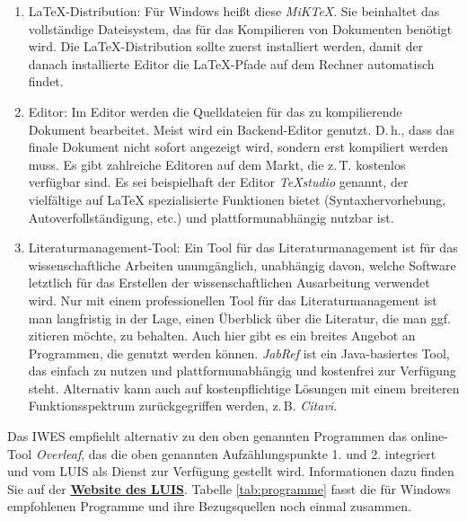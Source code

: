 \begin{enumerate}
	\item \LaTeX{}-Distribution: Für Windows heißt diese \textit{MiKTeX}. Sie beinhaltet das vollständige Dateisystem, das für das Kompilieren von Dokumenten benötigt wird. Die \LaTeX{}-Distribution sollte zuerst installiert werden, damit der danach installierte Editor die \LaTeX{}-Pfade auf dem Rechner automatisch findet.\\
	\item Editor: Im Editor werden die Quelldateien für das zu kompilierende Dokument bearbeitet. Meist wird ein Backend-Editor genutzt. D.\,h., dass das finale Dokument nicht sofort angezeigt wird, sondern erst kompiliert werden muss. Es gibt zahlreiche Editoren auf dem Markt, die z.\,T. kostenlos verfügbar sind. Es sei beispielhaft der Editor \textit{TeXstudio} genannt, der vielfältige auf \LaTeX{} spezialisierte Funktionen bietet (Syntaxhervorhebung, Autoverfollständigung, etc.) und plattformunabhängig nutzbar ist. \\
	\item Literaturmanagement-Tool: Ein Tool für das Literaturmanagement ist für das wissenschaftliche Arbeiten unumgänglich, unabhängig davon, welche Software letztlich für das Erstellen der wissenschaftlichen Ausarbeitung verwendet wird. Nur mit einem professionellen Tool für das Literaturmanagement ist man langfristig in der Lage, einen Überblick über die Literatur, die man ggf. zitieren möchte, zu behalten. Auch hier gibt es ein breites Angebot an Programmen, die genutzt werden können. \textit{JabRef} ist ein Java-basiertes Tool, das einfach zu nutzen und plattformunabhängig und kostenfrei zur Verfügung steht. Alternativ kann auch auf kostenpflichtige Lösungen mit einem breiteren Funktionsspektrum zurückgegriffen werden, z.\,B. \textit{Citavi}.
\end{enumerate}

Das IWES empfiehlt alternativ zu den oben genannten Programmen das online-Tool \textit{Overleaf}, das die oben genannten Aufzählungspunkte 1. und 2. integriert und vom LUIS als Dienst zur Verfügung gestellt wird. Informationen dazu finden Sie auf der \href{https://www.luis.uni-hannover.de/de/services/speichersysteme/dateiservice/cloud-dienste/overleaf}{\textbf{Website des LUIS}}. Tabelle \ref{tab:programme} fasst die für Windows empfohlenen Programme und ihre Bezugsquellen noch einmal zusammen.


